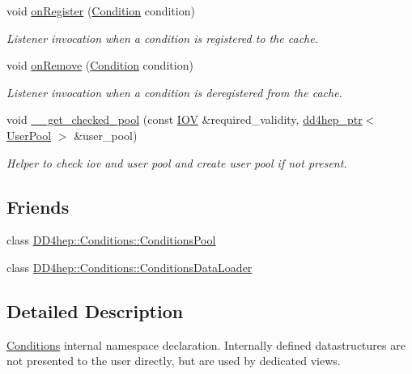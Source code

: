 \begin{DoxyCompactItemize}
void \hyperlink{class_d_d4hep_1_1_conditions_1_1_conditions_manager_object_a872970f1bb67a3d225be8c63422f848f}{onRegister} (\hyperlink{class_d_d4hep_1_1_conditions_1_1_condition}{Condition} condition)
\begin{DoxyCompactList}\small\item\em Listener invocation when a condition is registered to the cache. \item\end{DoxyCompactList}\item 
void \hyperlink{class_d_d4hep_1_1_conditions_1_1_conditions_manager_object_adb550d80aca3b897f299530b4c4bfd0b}{onRemove} (\hyperlink{class_d_d4hep_1_1_conditions_1_1_condition}{Condition} condition)
\begin{DoxyCompactList}\small\item\em Listener invocation when a condition is deregistered from the cache. \item\end{DoxyCompactList}\item 
void \hyperlink{class_d_d4hep_1_1_conditions_1_1_conditions_manager_object_a4e7c5a6f766e182c7fcdcf766c28f9a0}{\_\-\_\-get\_\-checked\_\-pool} (const \hyperlink{class_d_d4hep_1_1_i_o_v}{IOV} \&required\_\-validity, \hyperlink{class_d_d4hep_1_1dd4hep__ptr}{dd4hep\_\-ptr}$<$ \hyperlink{class_d_d4hep_1_1_conditions_1_1_user_pool}{UserPool} $>$ \&user\_\-pool)
\begin{DoxyCompactList}\small\item\em Helper to check iov and user pool and create user pool if not present. \item\end{DoxyCompactList}\end{DoxyCompactItemize}
\subsection*{Friends}
\begin{DoxyCompactItemize}
\item 
class \hyperlink{class_d_d4hep_1_1_conditions_1_1_conditions_manager_object_ae399ab8adc57b6187de6a733d9fcfc73}{DD4hep::Conditions::ConditionsPool}
\item 
class \hyperlink{class_d_d4hep_1_1_conditions_1_1_conditions_manager_object_a967e35cec9ace4f5cfb821c8d1f86f0b}{DD4hep::Conditions::ConditionsDataLoader}
\end{DoxyCompactItemize}


\subsection{Detailed Description}
\hyperlink{namespace_d_d4hep_1_1_conditions}{Conditions} internal namespace declaration. Internally defined datastructures are not presented to the user directly, but are used by dedicated views.

